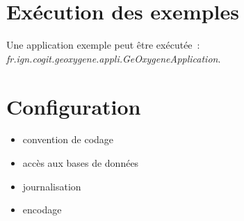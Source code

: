 \section{Exécution des exemples}
Une application exemple peut \^etre exécutée~: \emph{fr.ign.cogit.geoxygene.appli.GeOxygeneApplication}.


\section{Configuration}

\begin{itemize}[leftmargin=* ,parsep=0cm,itemsep=0cm,topsep=0cm]
\item convention de codage
\item accès aux bases de données
\item journalisation
\item encodage
\end{itemize}
